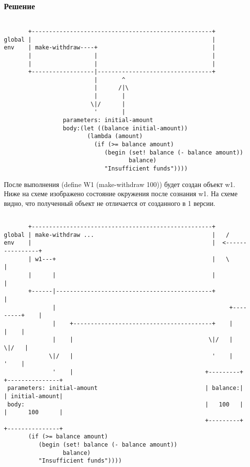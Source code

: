 \documentclass[10pt,a4paper]{article}
\begin{document}
\subsubsection*{Решение}

\lstset{ %
basicstyle=\footnotesize,       %
frame=single
}
\begin{lstlisting}

       +----------------------------------------------------+
global |                                                    |
env    | make-withdraw----+                                 |
       |                  |                                 |
       |                  |                                 |
       +------------------|---------------------------------+
                          |       ^
                          |      /|\
                          |       |
                         \|/      |
                          '       |
                 parameters: initial-amount
                 body:(let ((balance initial-amount))
                        (lambda (amount)
                          (if (>= balance amount)
                             (begin (set! balance (- balance amount))
                                    balance)
                             "Insufficient funds"))))

\end{lstlisting}

После выполнения (define W1 (make-withdraw 100)) будет создан объект
w1. Ниже на схеме изображено состояние окружения после сознания w1. На
схеме видно, что полученный объект не отличается от созданного в 1 версии.

\begin{lstlisting}

       +----------------------------------------------------+
global | make-withdraw ...                                  |   /
env    |                                                    |  <----------------+
       | w1---+                                             |   \               |
       |      |                                             |                   |
       +------|---------------------------------------------+                   |
              |                                                  +---------+    |
              |    +----------------------------------------+    |         |    |
              |    |                                       \|/   |        \|/   |
             \|/   |                                        '    |         '    |
              '    |                                      +---------+ +---------------+
 parameters: initial-amount                               | balance:| | initial-amount|
 body:                                                    |   100   | |      100      |
                                                          +---------+ +---------------+
       (if (>= balance amount)
          (begin (set! balance (- balance amount))
                 balance)
          "Insufficient funds"))))

\end{lstlisting}
\end{document}
